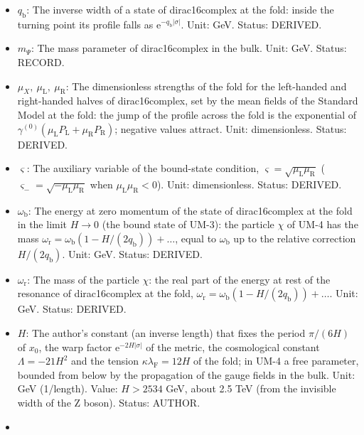 \documentclass[
  10pt,
]{article}
\providecommand{\tightlist}{%
  \setlength{\itemsep}{0pt}\setlength{\parskip}{0pt}}
\begin{document}
\begin{itemize}
\tightlist
\item
  \(q_{\mathrm{b}}\): The inverse width of a state of dirac16complex at
  the fold: inside the turning point its profile falls as
  \(\mathrm{e}^{-q_{\mathrm{b}}\lvert\sigma\rvert}\). Unit: GeV. Status:
  DERIVED.
\item
  \(m_\Psi\): The mass parameter of dirac16complex in the bulk. Unit:
  GeV. Status: RECORD.
\item
  \(\mu_X,\ \mu_{\mathrm{L}},\ \mu_{\mathrm{R}}\): The dimensionless
  strengths of the fold for the left-handed and right-handed halves of
  dirac16complex, set by the mean fields of the Standard Model at the
  fold: the jump of the profile across the fold is the exponential of
  \(\gamma^{(0)}(\mu_{\mathrm{L}}P_{\mathrm{L}} + \mu_{\mathrm{R}}P_{\mathrm{R}})\);
  negative values attract. Unit: dimensionless. Status: DERIVED.
\item
  \(\varsigma\): The auxiliary variable of the bound-state condition,
  \(\varsigma = \sqrt{\mu_{\mathrm{L}}\mu_{\mathrm{R}}}\)
  (\(\varsigma_- = \sqrt{-\mu_{\mathrm{L}}\mu_{\mathrm{R}}}\) when
  \(\mu_{\mathrm{L}}\mu_{\mathrm{R}} < 0\)). Unit: dimensionless.
  Status: DERIVED.
\item
  \(\omega_{\mathrm{b}}\): The energy at zero momentum of the state of
  dirac16complex at the fold in the limit \(H \to 0\) (the bound state
  of UM-3): the particle \(\chi\) of UM-4 has the mass
  \(\omega_{\mathrm{r}} = \omega_{\mathrm{b}}(1 - H/(2q_{\mathrm{b}})) + \dots\),
  equal to \(\omega_{\mathrm{b}}\) up to the relative correction
  \(H/(2q_{\mathrm{b}})\). Unit: GeV. Status: DERIVED.
\item
  \(\omega_{\mathrm{r}}\): The mass of the particle \(\chi\): the real
  part of the energy at rest of the resonance of dirac16complex at the
  fold,
  \(\omega_{\mathrm{r}} = \omega_{\mathrm{b}}(1 - H/(2q_{\mathrm{b}})) + \dots\).
  Unit: GeV. Status: DERIVED.
\item
  \(H\): The author's constant (an inverse length) that fixes the period
  \(\pi/(6H)\) of \(x_0\), the warp factor
  \(\mathrm{e}^{-2H\lvert\sigma\rvert}\) of the metric, the cosmological
  constant \(\Lambda = -21H^2\) and the tension
  \(\kappa\lambda_{\mathrm{F}} = 12H\) of the fold; in UM-4 a free
  parameter, bounded from below by the propagation of the gauge fields
  in the bulk. Unit: GeV (1/length). Value: \(H > 2534\) GeV, about 2.5
  TeV (from the invisible width of the Z boson). Status: AUTHOR.
\item

\end{itemize}
\end{document}
